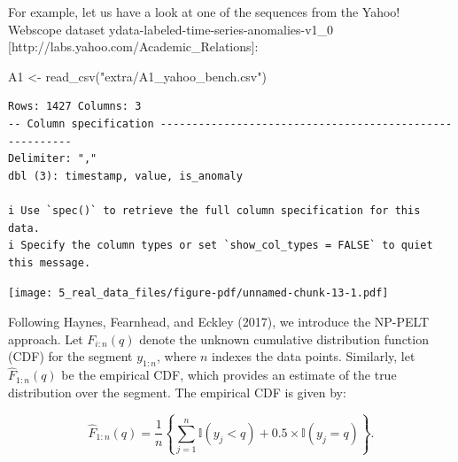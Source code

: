 \documentclass[
  letterpaper,
  DIV=11,
  numbers=noendperiod]{scrreprt}
\newenvironment{Shaded}{\begin{snugshade}}{\end{snugshade}}
\newcommand{\AttributeTok}[1]{\textcolor[rgb]{0.40,0.45,0.13}{#1}}
\newcommand{\DecValTok}[1]{\textcolor[rgb]{0.68,0.00,0.00}{#1}}
\newcommand{\FunctionTok}[1]{\textcolor[rgb]{0.28,0.35,0.67}{#1}}
\newcommand{\NormalTok}[1]{\textcolor[rgb]{0.00,0.23,0.31}{#1}}
\newcommand{\OtherTok}[1]{\textcolor[rgb]{0.00,0.23,0.31}{#1}}
\newcommand{\SpecialCharTok}[1]{\textcolor[rgb]{0.37,0.37,0.37}{#1}}
\newcommand{\StringTok}[1]{\textcolor[rgb]{0.13,0.47,0.30}{#1}}
\begin{document}
For example, let us have a look at one of the sequences from the Yahoo!
Webscope dataset ydata-labeled-time-series-anomalies-v1\_0
{[}http://labs.yahoo.com/Academic\_Relations{]}:

\begin{Shaded}
\begin{Highlighting}[]
\NormalTok{A1 }\OtherTok{\textless{}{-}} \FunctionTok{read\_csv}\NormalTok{(}\StringTok{"extra/A1\_yahoo\_bench.csv"}\NormalTok{)}
\end{Highlighting}
\end{Shaded}

\begin{verbatim}
Rows: 1427 Columns: 3
-- Column specification --------------------------------------------------------
Delimiter: ","
dbl (3): timestamp, value, is_anomaly

i Use `spec()` to retrieve the full column specification for this data.
i Specify the column types or set `show_col_types = FALSE` to quiet this message.
\end{verbatim}

\begin{Shaded}
\end{Shaded}

\texttt{[image: 5\_real\_data\_files/figure-pdf/unnamed-chunk-13-1.pdf]}

Following Haynes, Fearnhead, and Eckley (2017), we introduce the NP-PELT
approach. Let \(F_{i:n}(q)\) denote the unknown cumulative distribution
function (CDF) for the segment \(y_{1:n}\), where \(n\) indexes the data
points. Similarly, let \(\hat{F}_{1:n}(q)\) be the empirical CDF, which
provides an estimate of the true distribution over the segment. The
empirical CDF is given by:

\[
\hat{F}_{1:n}(q) = \frac{1}{n} \left\{ \sum_{j=1}^{n} \mathbb{I}(y_j < q) + 0.5 \times \mathbb{I}(y_j = q) \right\}.
\]
\end{document}
